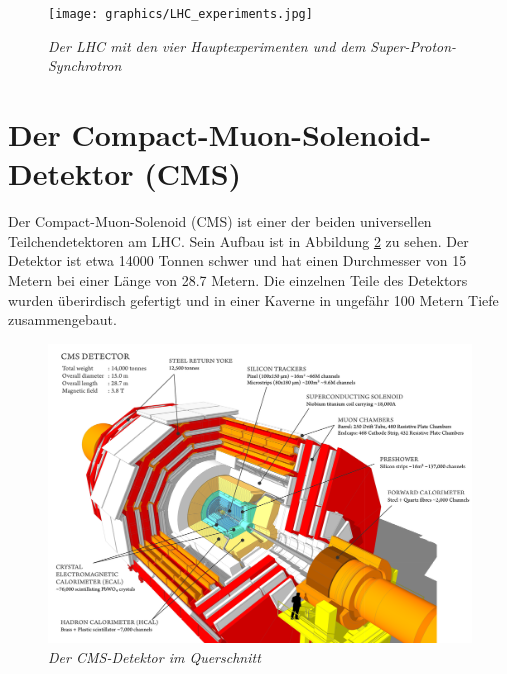 \begin{figure}[hhh]
 \begin{center}
   \texttt{[image: graphics/LHC\_experiments.jpg]}
   \parbox[b]{12cm}{
     \caption[Large-Hadron-Collider]
             {\label{fig:LHC} \it\!Der LHC mit den vier Hauptexperimenten und dem Super-Proton-Synchrotron \cite{Team:40525}}
   }
 \end{center}
\end{figure}

\section{Der Compact-Muon-Solenoid-Detektor (CMS)}
\label{ch:Experiment:sec:CMS}

Der Compact-Muon-Solenoid (CMS) ist einer der beiden universellen Teilchendetektoren am LHC. Sein Aufbau ist in Abbildung \ref{fig:cms_sectional} zu sehen. Der Detektor ist etwa \num{14000} Tonnen schwer und hat einen Durchmesser von \num{15} Metern bei einer L\"ange von \num{28,7} Metern. Die einzelnen Teile des Detektors wurden \"uberirdisch gefertigt und in einer Kaverne in ungef\"ahr \num{100} Metern Tiefe zusammengebaut.\\
\begin{figure}[hhh]
 \begin{center}
   \includegraphics[width=\textwidth]{graphics/cms_sectional.png}
   \parbox[b]{12cm}{
     \caption[CMS-Detektor]
             {\label{fig:cms_sectional} \it\!Der CMS-Detektor im Querschnitt \cite{cms_sectional}}
   }
 \end{center}
\end{figure}

